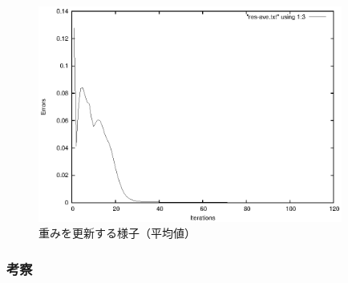 \begin{figure}[h]
 \begin{center}
  \includegraphics[width=10.0cm]{figs/sample2.eps}
  \caption{重みを更新する様子（平均値）}
  \label{fig:level2}
 \end{center}
\end{figure}


\subsubsection{考察}


